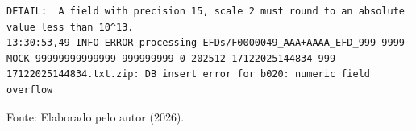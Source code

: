 \begin{quadro}[H]
    \centering
    \caption{Exemplo de log de erro durante a carga}
    \label{qua:log_loading_incorreto}
\begin{lstlisting}[basicstyle=\ttfamily\footnotesize, frame=single]
DETAIL:  A field with precision 15, scale 2 must round to an absolute value less than 10^13.
13:30:53,49 INFO ERROR processing EFDs/F0000049_AAA+AAAA_EFD_999-9999-MOCK-99999999999999-999999999-0-202512-17122025144834-999-17122025144834.txt.zip: DB insert error for b020: numeric field overflow
\end{lstlisting}

    \vspace{0.2cm}
    \small{Fonte: Elaborado pelo autor (2026).}
\end{quadro}
